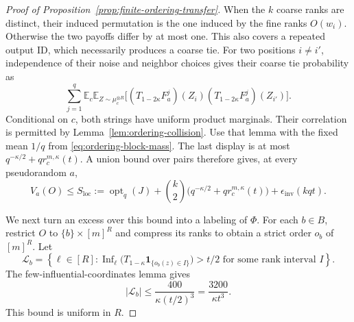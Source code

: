 \begin{proof}[Proof of Proposition~\ref{prop:finite-ordering-transfer}]
When the \(k\) coarse ranks are distinct, their induced permutation
is the one induced by the fine ranks \(O(w_i)\).  Otherwise the two
payoffs differ by at most one.  This also covers a repeated output ID,
which necessarily produces a coarse tie.  For two positions \(i\ne i'\),
independence of their noise and neighbor choices gives their coarse
tie probability as
\[
 \sum_{j=1}^q
 \mathbb E_c\mathbb E_{Z\sim\mu_c^{\otimes R}}
 \bigl[
  (T_{1-2\kappa}F_a^j)(Z_i)
  (T_{1-2\kappa}F_a^j)(Z_{i'})
 \bigr].
\]
Conditional on \(c\), both strings have uniform product marginals.
Their correlation is permitted by
Lemma~\ref{lem:ordering-collision}.  Use that lemma with the fixed
mean \(1/q\) from \eqref{eq:ordering-block-mass}.  The last display is at most
\(q^{-\kappa/2}+q r_c^{m,\kappa}(t)\).  A union bound over pairs therefore gives,
at every pseudorandom \(a\),
\begin{equation}
 V_a(O)\le
 S_{\mathrm{loc}}:=\operatorname{opt}_q(J)
 +\binom{k}{2}\bigl(q^{-\kappa/2}+q r_c^{m,\kappa}(t)\bigr)
 +\epsilon_{\mathrm{inv}}(kqt).
\label{eq:ordering-pseudorandom-bound}
\end{equation}

We next turn an excess over this bound into a labeling of \(\Phi\).
For each \(b\in B\), restrict \(O\) to
\(\{b\}\times[m]^R\) and compress its ranks to obtain a strict order
\(o_b\) of \([m]^R\).  Let
\[
 \mathcal L_b=\left\{\ell\in[R]:
   \operatorname{Inf}_\ell
    \bigl(T_{1-\kappa}\mathbf1_{\{o_b(z)\in I\}}\bigr)>t/2
   \text{ for some rank interval }I\right\}.
\]
The few-influential-coordinates lemma
\cite[Definition~4.2 and Lemma~4.3]{GuruswamiEtAl2011OrderingCSP}
gives
\begin{equation}
 |\mathcal L_b|\le\frac{400}{\kappa(t/2)^3}
 =\frac{3200}{\kappa t^3}.
\label{eq:ordering-right-candidates}
\end{equation}
This bound is uniform in \(R\).


\end{proof}
